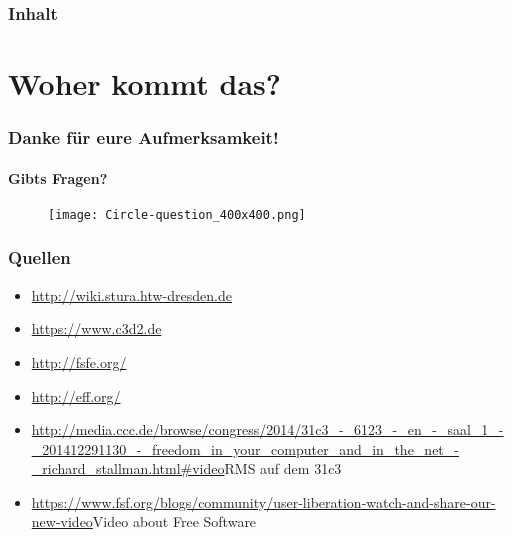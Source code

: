 \documentclass{beamer}              %
\begin{document}
\begin{frame}
  \frametitle{Inhalt}
  \tableofcontents
\end{frame}

\AtBeginSection{%
  \tableofcontents[currentsection]
}

\section{Woher kommt das?}










\begin{frame}
  \frametitle{Danke für eure Aufmerksamkeit!}
  \framesubtitle{Gibts Fragen?}

  \begin{figure}
      \texttt{[image: Circle-question\_400x400.png]}
      \label{fig:Fragezeichenschild}
  \end{figure}

\end{frame}


\begin{frame}
  \frametitle{Quellen}
  \begin{itemize}
    \item \url{http://wiki.stura.htw-dresden.de}
    \item \url{https://www.c3d2.de}
    \item \url{http://fsfe.org/}
    \item \url{http://eff.org/}
    \item \url{http://media.ccc.de/browse/congress/2014/31c3_-_6123_-_en_-_saal_1_-_201412291130_-_freedom_in_your_computer_and_in_the_net_-_richard_stallman.html#video}{RMS auf dem 31c3}
    \item \url{https://www.fsf.org/blogs/community/user-liberation-watch-and-share-our-new-video}{Video about Free Software}
    
  \end{itemize}  
\end{frame}
\end{document}
